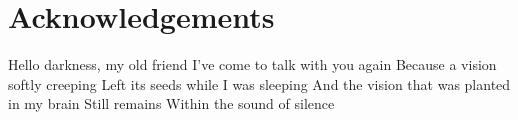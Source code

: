 \section*{Acknowledgements}
Hello darkness, my old friend
I've come to talk with you again
Because a vision softly creeping
Left its seeds while I was sleeping
And the vision that was planted in my brain
Still remains
Within the sound of silence
